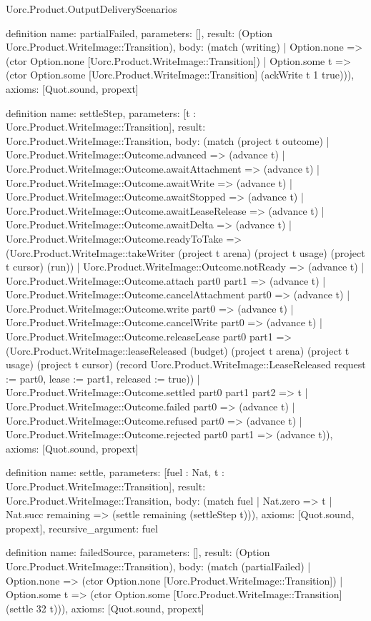\begin{lexlean}{Uorc.Product.OutputDeliveryScenarios}
\begin{semanticmodule}
definition{
  name: partialFailed,
  parameters: [],
  result: (Option Uorc.Product.WriteImage::Transition),
  body: (match (writing)
    | Option.none => (ctor Option.none [Uorc.Product.WriteImage::Transition])
    | Option.some t => (ctor Option.some [Uorc.Product.WriteImage::Transition] (ackWrite t 1 true))),
  axioms: [Quot.sound, propext]
}

definition{
  name: settleStep,
  parameters: [t : Uorc.Product.WriteImage::Transition],
  result: Uorc.Product.WriteImage::Transition,
  body: (match (project t outcome)
    | Uorc.Product.WriteImage::Outcome.advanced => (advance t)
    | Uorc.Product.WriteImage::Outcome.awaitAttachment => (advance t)
    | Uorc.Product.WriteImage::Outcome.awaitWrite => (advance t)
    | Uorc.Product.WriteImage::Outcome.awaitStopped => (advance t)
    | Uorc.Product.WriteImage::Outcome.awaitLeaseRelease => (advance t)
    | Uorc.Product.WriteImage::Outcome.awaitDelta => (advance t)
    | Uorc.Product.WriteImage::Outcome.readyToTake => (Uorc.Product.WriteImage::takeWriter (project t arena) (project t usage) (project t cursor) (run))
    | Uorc.Product.WriteImage::Outcome.notReady => (advance t)
    | Uorc.Product.WriteImage::Outcome.attach part0 part1 => (advance t)
    | Uorc.Product.WriteImage::Outcome.cancelAttachment part0 => (advance t)
    | Uorc.Product.WriteImage::Outcome.write part0 => (advance t)
    | Uorc.Product.WriteImage::Outcome.cancelWrite part0 => (advance t)
    | Uorc.Product.WriteImage::Outcome.releaseLease part0 part1 => (Uorc.Product.WriteImage::leaseReleased (budget) (project t arena) (project t usage) (project t cursor) (record Uorc.Product.WriteImage::LeaseReleased {request := part0, lease := part1, released := true}))
    | Uorc.Product.WriteImage::Outcome.settled part0 part1 part2 => t
    | Uorc.Product.WriteImage::Outcome.failed part0 => (advance t)
    | Uorc.Product.WriteImage::Outcome.refused part0 => (advance t)
    | Uorc.Product.WriteImage::Outcome.rejected part0 part1 => (advance t)),
  axioms: [Quot.sound, propext]
}

definition{
  name: settle,
  parameters: [fuel : Nat, t : Uorc.Product.WriteImage::Transition],
  result: Uorc.Product.WriteImage::Transition,
  body: (match fuel | Nat.zero => t | Nat.succ remaining => (settle remaining (settleStep t))),
  axioms: [Quot.sound, propext],
  recursive_argument: fuel
}

definition{
  name: failedSource,
  parameters: [],
  result: (Option Uorc.Product.WriteImage::Transition),
  body: (match (partialFailed)
    | Option.none => (ctor Option.none [Uorc.Product.WriteImage::Transition])
    | Option.some t => (ctor Option.some [Uorc.Product.WriteImage::Transition] (settle 32 t))),
  axioms: [Quot.sound, propext]
}


\end{semanticmodule}
\end{lexlean}
